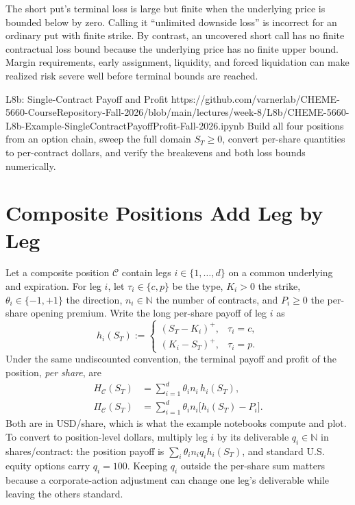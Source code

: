 \documentclass[11pt]{article}
\begin{document}
The short put's terminal loss is large but finite when the underlying price is bounded below by zero. Calling it ``unlimited downside loss'' is incorrect for an ordinary put with finite strike. By contrast, an uncovered short call has no finite contractual loss bound because the underlying price has no finite upper bound. Margin requirements, early assignment, liquidity, and forced liquidation can make realized risk severe well before terminal bounds are reached.

\notebooklink
  {L8b: Single-Contract Payoff and Profit}
  {https://github.com/varnerlab/CHEME-5660-CourseRepository-Fall-2026/blob/main/lectures/week-8/L8b/CHEME-5660-L8b-Example-SingleContractPayoffProfit-Fall-2026.ipynb}
  {Build all four positions from an option chain, sweep the full domain $S_T\geq0$, convert per-share quantities to per-contract dollars, and verify the breakevens and both loss bounds numerically.}

\section{Composite Positions Add Leg by Leg}

Let a composite position $\mathcal C$ contain legs $i\in\{1,\ldots,d\}$ on a common underlying and expiration. For leg $i$, let $\tau_i\in\{c,p\}$ be the type, $K_i>0$ the strike, $\theta_i\in\{-1,+1\}$ the direction, $n_i\in\mathbb N$ the number of contracts, and $P_i\geq0$ the per-share opening premium. Write the long per-share payoff of leg $i$ as
\begin{equation}
  \label{eq:leg-payoff}
  h_i(S_T):=
  \begin{cases}
    (S_T-K_i)^+, & \tau_i=c,\\
    (K_i-S_T)^+, & \tau_i=p.
  \end{cases}
\end{equation}
Under the same undiscounted convention, the terminal payoff and profit of the position, \emph{per share}, are
\begin{align}
  \label{eq:composite-payoff}
  H_{\mathcal C}(S_T)&=\sum_{i=1}^{d}\theta_in_i\,h_i(S_T),\\
  \label{eq:composite-profit}
  \Pi_{\mathcal C}(S_T)&=\sum_{i=1}^{d}\theta_in_i
  \bigl[h_i(S_T)-P_i\bigr].
\end{align}
Both are in USD/share, which is what the example notebooks compute and plot. To convert to position-level dollars, multiply leg $i$ by its deliverable $q_i\in\mathbb N$ in shares/contract: the position payoff is $\sum_i\theta_in_iq_ih_i(S_T)$, and standard U.S. equity options carry $q_i=100$. Keeping $q_i$ outside the per-share sum matters because a corporate-action adjustment can change one leg's deliverable while leaving the others standard.
\end{document}
